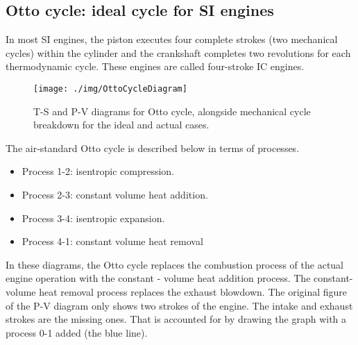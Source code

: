 \subsection{Otto cycle: ideal cycle for SI engines}
In most SI engines, the piston executes four complete strokes (two mechanical cycles) within the cylinder and the crankshaft completes two revolutions for each thermodynamic cycle. These engines are called four-stroke IC engines.
\begin{figure}
  \centering
  \texttt{[image: ./img/OttoCycleDiagram]}
  \caption{T-S and P-V diagrams for Otto cycle, alongside mechanical cycle breakdown for the ideal and actual cases.}
\end{figure}
The air-standard Otto cycle is described below in terms of processes.
\begin{itemize}[noitemsep]
  \item Process 1-2: isentropic compression.
  \item Process 2-3: constant volume heat addition.
  \item Process 3-4: isentropic expansion.
  \item Process 4-1: constant volume heat removal
\end{itemize}
In these diagrams, the Otto cycle replaces the combustion process of the actual engine operation with the constant - volume heat addition process. The constant-volume heat removal process replaces the exhaust blowdown. The original figure of the P-V diagram only shows two strokes of the engine. The intake and exhaust strokes are the missing ones. That is accounted for by drawing the graph with a process 0-1 added (the blue line).
